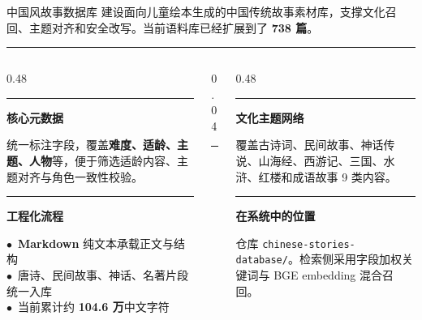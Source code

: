 \documentclass{beamer}
\newcommand{\kw}[1]{\textcolor{importantred}{\textbf{#1}}}
\newcommand{\goldrule}{\par\vspace{3pt}\noindent\textcolor{accentgold!60}{\rule{\linewidth}{0.4pt}}\par\vspace{3pt}}
\newcommand{\sidehead}[2][buptred]{%
  {\color{#1}\rule[-0.15em]{2.5pt}{1.0em}}\hspace{0.45em}\textbf{\small\color{darkred}#2}\par
  \vspace{2pt}%
}
\newcommand{\redot}{\textcolor{buptred}{\scriptsize$\bullet$}~}
\begin{document}
\begin{frame}[t]{中国风故事数据库}
    \vspace{-0.05cm}
    \footnotesize
    建设面向儿童绘本生成的中国传统故事素材库，支撑文化召回、主题对齐和安全改写。当前语料库已经扩展到了 \textbf{738 篇}。
    \goldrule
    \vspace{0.08cm}
    \begin{columns}[T, onlytextwidth]
        \begin{column}[T]{0.48\linewidth}
            \sidehead{核心元数据}
            \scriptsize
            统一标注字段，覆盖\textbf{难度、适龄、主题、人物}等，便于筛选适龄内容、主题对齐与角色一致性校验。
            \vspace{0.32cm}

            \sidehead[accentgold]{工程化流程}
            \scriptsize
            \redot \textbf{Markdown} 纯文本承载正文与结构\\[2pt]
            \redot 唐诗、民间故事、神话、名著片段统一入库\\[2pt]
            \redot 当前累计约 \kw{104.6 万}中文字符
        \end{column}
        \begin{column}[T]{0.04\linewidth}
            \centering\textcolor{accentgold!60}{\rule{0.4pt}{5.4em}}
        \end{column}
        \begin{column}[T]{0.48\linewidth}
            \sidehead[accentgold]{文化主题网络}
            \scriptsize
            覆盖古诗词、民间故事、神话传说、山海经、西游记、三国、水浒、红楼和成语故事 9 类内容。
            \vspace{0.32cm}

            \sidehead{在系统中的位置}
            \scriptsize
            仓库 \texttt{chinese-stories-database/}。检索侧采用字段加权关键词与 BGE embedding 混合召回。
        \end{column}
    \end{columns}
\end{frame}
\end{document}
